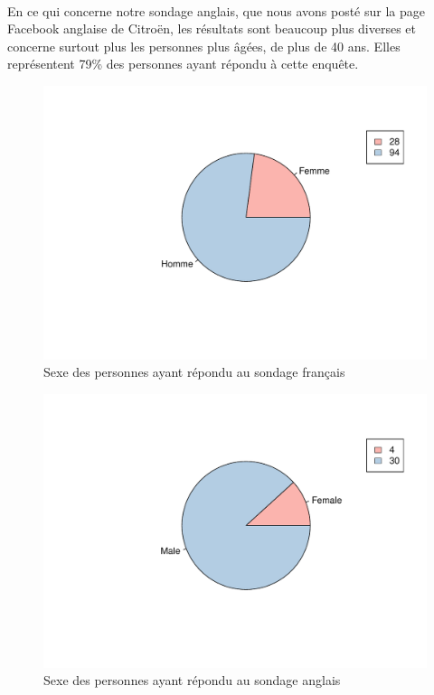 \documentclass[12pt]{article}\usepackage[]{graphicx}\usepackage[]{color}
\makeatletter
\def\maxwidth{ %
  \ifdim\Gin@nat@width>\linewidth
    \linewidth
  \else
    \Gin@nat@width
  \fi
}
\newenvironment{knitrout}{}{} %
\makeatother
\begin{document}
\paragraph{} En ce qui concerne notre sondage anglais, que nous avons posté sur
la page Facebook anglaise de Citroën, les résultats sont beaucoup plus diverses
et concerne surtout plus les personnes plus âgées, de plus de 40 ans. Elles
représentent 79\% des personnes ayant répondu à cette enquête.

\begin{knitrout}
\color{fgcolor}\begin{figure}[H]
\includegraphics[width=\maxwidth]{figure/sexe_fr-1} \caption[Sexe des personnes ayant répondu au sondage français]{Sexe des personnes ayant répondu au sondage français}\label{fig:sexe fr}
\end{figure}


\end{knitrout}

\begin{knitrout}
\color{fgcolor}\begin{figure}[H]
\includegraphics[width=\maxwidth]{figure/sexe_en-1} \caption[Sexe des personnes ayant répondu au sondage anglais]{Sexe des personnes ayant répondu au sondage anglais}\label{fig:sexe en}
\end{figure}


\end{knitrout}
\end{document}
